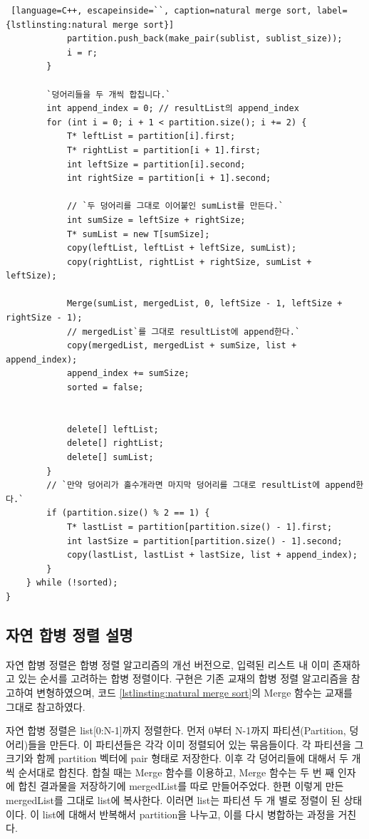 \documentclass{article}
\begin{document}
\begin{lstlisting} [language=C++, escapeinside=``, caption=natural merge sort, label={lstlinsting:natural merge sort}]
			partition.push_back(make_pair(sublist, sublist_size));
			i = r;
		}

        `덩어리들을 두 개씩 합칩니다.`
		int append_index = 0; // resultList의 append_index
		for (int i = 0; i + 1 < partition.size(); i += 2) {
			T* leftList = partition[i].first;
			T* rightList = partition[i + 1].first;
			int leftSize = partition[i].second;
			int rightSize = partition[i + 1].second;

			// `두 덩어리를 그대로 이어붙인 sumList를 만든다.`
			int sumSize = leftSize + rightSize;
			T* sumList = new T[sumSize];
			copy(leftList, leftList + leftSize, sumList);
			copy(rightList, rightList + rightSize, sumList + leftSize);

			Merge(sumList, mergedList, 0, leftSize - 1, leftSize + rightSize - 1);
			// mergedList`를 그대로 resultList에 append한다.`
			copy(mergedList, mergedList + sumSize, list + append_index);
			append_index += sumSize;
			sorted = false;


			delete[] leftList;
			delete[] rightList;
			delete[] sumList;
		}
		// `만약 덩어리가 홀수개라면 마지막 덩어리를 그대로 resultList에 append한다.`
		if (partition.size() % 2 == 1) {
			T* lastList = partition[partition.size() - 1].first;
			int lastSize = partition[partition.size() - 1].second;
			copy(lastList, lastList + lastSize, list + append_index);
		}
	} while (!sorted);
}

\end{lstlisting}
\subsection{자연 합병 정렬 설명}
자연 합병 정렬은 합병 정렬 알고리즘의 개선 버전으로, 입력된 리스트 내 이미 존재하고 있는 순서를 고려하는 합병 정렬이다. 구현은 기존 교재의 합병 정렬 알고리즘을 참고하여 변형하였으며, 코드 \ref{lstlinsting:natural merge sort}의 Merge 함수는 교재를 그대로 참고하였다.

자연 합병 정렬은 list[0:N-1]까지 정렬한다. 먼저 0부터 N-1까지 파티션(Partition, 덩어리)들을 만든다. 이 파티션들은 각각 이미 정렬되어 있는 묶음들이다. 각 파티션을 그 크기와 함께 partition 벡터에 pair 형태로 저장한다. 이후 각 덩어리들에 대해서 두 개씩 순서대로 합친다. 합칠 때는 Merge 함수를 이용하고, Merge 함수는 두 번 째 인자에 합친 결과물을 저장하기에 mergedList를 따로 만들어주었다. 한편 이렇게 만든 mergedList를 그대로 list에 복사한다. 이러면 list는 파티션 두 개 별로 정렬이 된 상태이다. 이 list에 대해서 반복해서 partition을 나누고, 이를 다시 병합하는 과정을 거친다.
\end{document}
